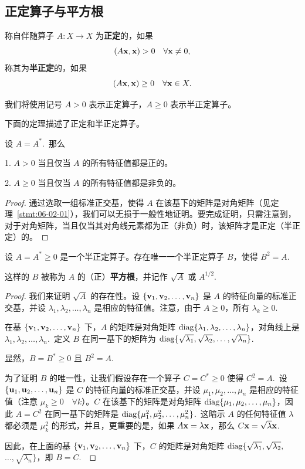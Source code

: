 \subsection{正定算子与平方根}\label{sec:06-03-01}

\begin{definition*}
称自伴随算子 $A: X \to X$ 为\textbf{正定}的，如果
$$(A\mathbf{x}, \mathbf{x}) > 0 \quad \forall \mathbf{x} \neq 0,$$
称其为\textbf{半正定}的，如果
$$(A\mathbf{x}, \mathbf{x}) \geq 0 \quad \forall \mathbf{x} \in X.$$
\end{definition*}

我们将使用记号 $A > 0$ 表示正定算子，$A \geq 0$ 表示半正定算子。

下面的定理描述了正定和半正定算子。

\begin{theorem}\label{stmt:06-03-01} 设 $A = A^*$.~那么

1. $A > 0$ 当且仅当 $A$ 的所有特征值都是正的。

2. $A \geq 0$ 当且仅当 $A$ 的所有特征值都是非负的。\end{theorem}

\begin{proof}通过选取一组标准正交基，使得 $A$ 在该基下的矩阵是对角矩阵（见定理~\ref{stmt:06-02-01}），我们可以无损于一般性地证明。要完成证明，只需注意到，对于对角矩阵，当且仅当其对角线元素都为正（非负）时，该矩阵才是正定（半正定）的。\end{proof}

\begin{corollary}\label{stmt:06-03-02}
设 $A = A^* \geq 0$ 是一个半正定算子。存在唯一一个半正定算子 $B$，使得 $B^2 = A$.~
\end{corollary}

这样的 $B$ 被称为 $A$ 的（正）\textbf{平方根}，并记作 $\sqrt{A}$ 或 $A^{1/2}$.~

\begin{proof}我们来证明 $\sqrt{A}$ 的存在性。设 $\{\mathbf{v}_1, \mathbf{v}_2, \dots, \mathbf{v}_n\}$ 是 $A$ 的特征向量的标准正交基，并设 $\lambda_1, \lambda_2, \dots, \lambda_n$ 是相应的特征值。注意，由于 $A \geq 0$，所有 $\lambda_k \geq 0$.~

在基 $\{\mathbf{v}_1, \mathbf{v}_2, \dots, \mathbf{v}_n\}$ 下，$A$ 的矩阵是对角矩阵 $\operatorname{diag}\{\lambda_1, \lambda_2, \dots, \lambda_n\}$，对角线上是 $\lambda_1, \lambda_2, \dots, \lambda_n$.~定义 $B$ 在同一基下的矩阵为 $\operatorname{diag}\{\sqrt{\lambda_1}, \sqrt{\lambda_2}, \dots, \sqrt{\lambda_n}\}$.~

显然，$B = B^* \geq 0$ 且 $B^2 = A$.~

为了证明 $B$ 的唯一性，让我们假设存在一个算子 $C = C^* \geq 0$ 使得 $C^2 = A$.~设 $\{\mathbf{u}_1, \mathbf{u}_2, \dots, \mathbf{u}_n\}$ 是 $C$ 的特征向量的标准正交基，并设 $\mu_1, \mu_2, \dots, \mu_n$ 是相应的特征值（注意 $\mu_k \geq 0 \quad \forall k$）。$C$ 在该基下的矩阵是对角矩阵 $\operatorname{diag}\{\mu_1, \mu_2, \dots, \mu_n\}$，因此 $A = C^2$ 在同一基下的矩阵是 $\operatorname{diag}\{\mu_1^2, \mu_2^2, \dots, \mu_n^2\}$.~这暗示 $A$ 的任何特征值 $\lambda$ 都必须是 $\mu_k^2$ 的形式，并且，更重要的是，如果 $A\mathbf{x} = \lambda \mathbf{x}$，那么 $C\mathbf{x} = \sqrt{\lambda} \mathbf{x}$.~

因此，在上面的基 $\{\mathbf{v}_1, \mathbf{v}_2, \dots, \mathbf{v}_n\}$ 下，$C$ 的矩阵是对角矩阵 $\operatorname{diag}\{\sqrt{\lambda_1}, \sqrt{\lambda_2}, $ $\dots, \sqrt{\lambda_n}\}$，即 $B = C$.~\end{proof}

